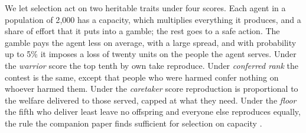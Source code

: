 \documentclass[10pt,twocolumn,letterpaper]{article}
\theoremstyle{definition}
\begin{document}
We let selection act on two heritable traits under four scores. Each agent in a population of 2{,}000 has a capacity, which multiplies everything it produces, and a share of effort that it puts into a gamble; the rest goes to a safe action. The gamble pays the agent less on average, with a large spread, and with probability up to 5\% it imposes a loss of twenty units on the people the agent serves. Under the \emph{warrior} score the top tenth by own take reproduce. Under \emph{conferred rank} the contest is the same, except that people who were harmed confer nothing on whoever harmed them. Under the \emph{caretaker} score reproduction is proportional to the welfare delivered to those served, capped at what they need. Under the \emph{floor} the fifth who deliver least leave no offspring and everyone else reproduces equally, the rule the companion paper finds sufficient for selection on capacity \cite{taylor}.
\end{document}
